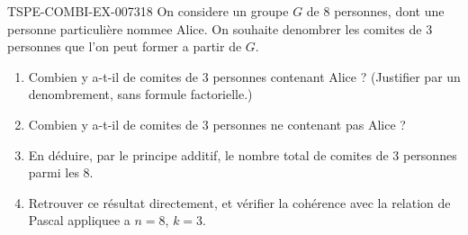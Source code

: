\begin{exercice}{TSPE-COMBI-EX-007}{3}{18}
On considere un groupe $G$ de $8$ personnes, dont une personne particulière nommee Alice. On souhaite denombrer les comites de $3$ personnes que l'on peut former a partir de $G$.
\begin{enumerate}
  \item Combien y a-t-il de comites de $3$ personnes contenant Alice ? (Justifier par un denombrement, sans formule factorielle.)
  \item Combien y a-t-il de comites de $3$ personnes ne contenant pas Alice ?
  \item En déduire, par le principe additif, le nombre total de comites de $3$ personnes parmi les $8$.
  \item Retrouver ce résultat directement, et vérifier la cohérence avec la relation de Pascal appliquee a $n=8$, $k=3$.
\end{enumerate}
\end{exercice}
